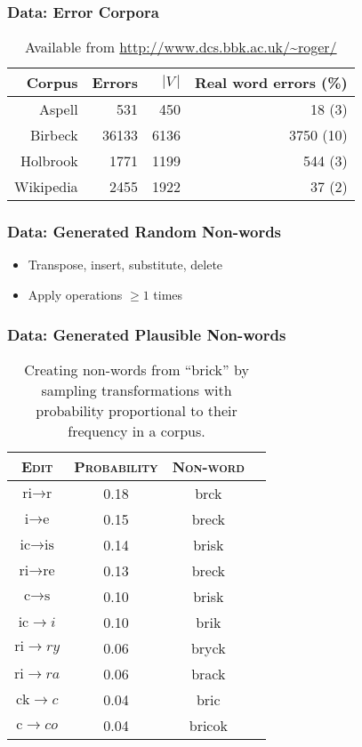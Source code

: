 \begin{frame}
\frametitle{Data: Error Corpora}
\begin{table}
    \centering
    \begin{tabular}{rrrr}
    Corpus & Errors & $|V\,|$ & Real word errors (\%) \\
    \hline
    Aspell    & 531   & 450  & 18 (3) \\
    Birbeck   & 36133 & 6136 & 3750 (10) \\
    Holbrook  & 1771  & 1199 & 544 (3) \\
    Wikipedia & 2455  & 1922 & 37 (2) \\ 
    \end{tabular}
    \caption{Available from \url{http://www.dcs.bbk.ac.uk/~roger/}}
\end{table}
\end{frame}

\begin{frame}
\frametitle{Data: Generated Random Non-words}
\begin{itemize}
    \item Transpose, insert, substitute, delete 
    \item Apply operations $\ge 1$ times 
\end{itemize}
\end{frame}

\begin{frame}
\frametitle{Data: Generated Plausible Non-words}
\begin{table}
    \centering
    \begin{tabular}{cccc}
    \textsc{Edit} & \textsc{Probability} & \textsc{Non-word} \\
    \hline
    $\text{ri} \rightarrow \text{r}$ & 0.18 & brck \\
    $\text{i} \rightarrow \text{e}$ & 0.15 & breck \\
    $\text{ic} \rightarrow \text{is}$ & 0.14 & brisk \\
    $\text{ri} \rightarrow \text{re}$ & 0.13 & breck \\
    $\text{c} \rightarrow \text{s}$ & 0.10 & brisk \\
    $\text{ic} \rightarrow {i}$ & 0.10 & brik \\
    $\text{ri} \rightarrow {ry}$ & 0.06 & bryck \\
    $\text{ri} \rightarrow {ra}$ & 0.06 & brack \\
    $\text{ck} \rightarrow {c}$ & 0.04 & bric \\
    $\text{c} \rightarrow {co}$  & 0.04 & bricok \\
    \end{tabular}
    \caption{Creating non-words from ``brick'' by sampling transformations with probability proportional to their frequency in a corpus.}
\end{table}
\end{frame}